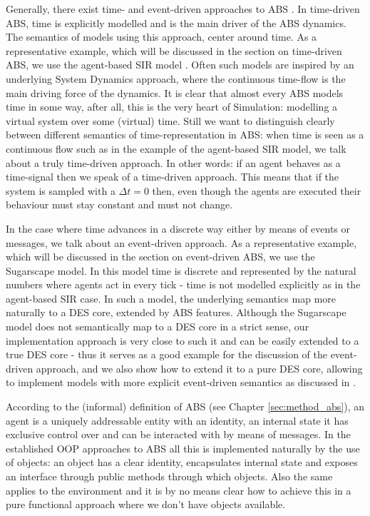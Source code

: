 Generally, there exist time- and event-driven approaches to ABS \cite{meyer_event-driven_2014}. In time-driven ABS, time is explicitly modelled and is the main driver of the ABS dynamics. The semantics of models using this approach, center around time. As a representative example, which will be discussed in the section on time-driven ABS, we use the agent-based SIR model \cite{macal_agent-based_2010, thaler_pure_2019}. Often such models are inspired by an underlying System Dynamics approach, where the continuous time-flow is the main driving force of the dynamics. It is clear that almost every ABS models time in some way, after all, this is the very heart of Simulation: modelling a virtual system over some (virtual) time. Still we want to distinguish clearly between different semantics of time-representation in ABS: when time is seen as a continuous flow such as in the example of the agent-based SIR model, we talk about a truly time-driven approach. In other words: if an agent behaves as a time-signal then we speak of a time-driven approach. This means that if the system is sampled with a $\Delta t = 0$ then, even though the agents are executed their behaviour must stay constant and must not change.

In the case where time advances in a discrete way either by means of events or messages, we talk about an event-driven approach. As a representative example, which will be discussed in the section on event-driven ABS, we use the Sugarscape model. In this model time is discrete and represented by the natural numbers where agents act in every tick - time is not modelled explicitly as in the agent-based SIR case. In such a model, the underlying semantics map more naturally to a DES core, extended by ABS features. Although the Sugarscape model does not semantically map to a DES core in a strict sense, our implementation approach is very close to such it and can be easily extended to a true DES core - thus it serves as a good example for the discussion of the event-driven approach, and we also show how to extend it to a pure DES core, allowing to implement models with more explicit event-driven semantics as discussed in \cite{meyer_event-driven_2014}. 

According to the (informal) definition of ABS (see Chapter \ref{sec:method_abs}), an agent is a uniquely addressable entity with an identity, an internal state it has exclusive control over and can be interacted with by means of messages. In the established OOP approaches to ABS all this is implemented naturally by the use of objects: an object has a clear identity, encapsulates internal state and exposes an interface through public methods through which objects. Also the same applies to the environment and it is by no means clear how to achieve this in a pure functional approach where we don't have objects available.


